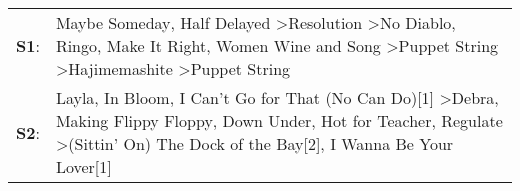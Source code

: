 \begin{supertabular}{p{0.03\textwidth}p{0.92\textwidth}}
 \textbf{S1}:  &          Maybe Someday\textsuperscript{}, \enspace Half Delayed\textsuperscript{} \textgreater \enspace Resolution\textsuperscript{} \textgreater \enspace No Diablo\textsuperscript{}, \enspace Ringo\textsuperscript{}, \enspace Make It Right\textsuperscript{}, \enspace Women Wine and Song\textsuperscript{} \textgreater \enspace Puppet String\textsuperscript{} \textgreater \enspace Hajimemashite\textsuperscript{} \textgreater \enspace Puppet String\textsuperscript{}  \enspace  \\
 \textbf{S2}:  &  Layla\textsuperscript{}, \enspace In Bloom\textsuperscript{}, \enspace I Can't Go for That (No Can Do)[1]\textsuperscript{} \textgreater \enspace Debra\textsuperscript{}, \enspace Making Flippy Floppy\textsuperscript{}, \enspace Down Under\textsuperscript{}, \enspace Hot for Teacher\textsuperscript{}, \enspace Regulate\textsuperscript{} \textgreater \enspace (Sittin' On) The Dock of the Bay[2]\textsuperscript{}, \enspace I Wanna Be Your Lover[1]\textsuperscript{}  \enspace  \\
\end{supertabular}

